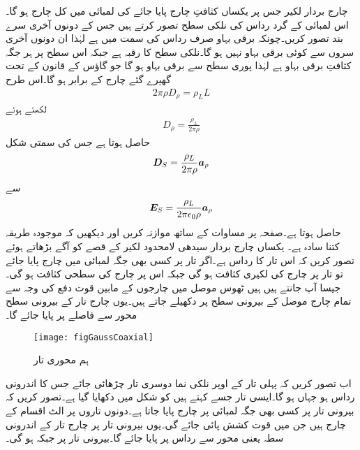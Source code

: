 چارج بردار لکیر جس پر یکساں کثافتِ چارج  پایا جائے  کی لمبائی  میں کل چارج  ہو گا۔اس لمبائی کے گرد  رداس کی نلکی سطح تصور کرتے ہیں جس کے دونوں آخری سرے بند تصور کریں۔چونکہ برقی بہاو صرف رداس کی سمت میں ہے لہٰذا ان دونوں آخری سروں سے کوئی برقی بہاو نہیں ہو گا۔نلکی سطح کا رقبہ  ہے جبکہ اس سطح پر ہر جگہ کثافتِ برقی بہاو   ہے لہٰذا پوری سطح سے  برقی بہاو ہو گا جو گاؤس کے قانون کے تحت گھیرے گئے چارج  کے برابر ہو گا۔اس طرح
\begin{align*}
2 \pi \rho D_{\rho} = \rho_L L
\end{align*}
لکھتے ہوئے
\begin{align*}
D_{\rho}=\frac{\rho_L}{2\pi \rho}
\end{align*}
حاصل ہوتا ہے جس کی سمتی شکل
\begin{align}\label{مساوات_گاؤس_لکیری_کثافت_کا_میدان}
{\ensuremath{{\boldsymbol{D}}}}_S=\frac{\rho_L}{2\pi \rho} {\boldsymbol{a}}_{\rho}
\end{align}
سے 
\begin{align*}
{\ensuremath{{\boldsymbol{E}}}}_S=\frac{\rho_L}{2\pi \epsilon_0\rho} {\boldsymbol{a}}_{\rho}
\end{align*}
حاصل ہوتا ہے۔صفحہ  پر مساوات  کے ساتھ موازنہ کریں اور دیکھیں کہ موجودہ طریقہ کتنا سادہ ہے۔
یکساں چارج بردار سیدھی لامحدود لکیر کے قصے کو آگے بڑھاتے ہوئے تصور کریں کہ اس تار کا رداس  ہے۔اگر تار پر کسی بھی  جگہ  لمبائی میں  چارج پایا جائے تو تار پر چارج کی لکیری کثافت   ہو گی جبکہ اس پر چارج کی سطحی کثافت  ہو گی۔جیسا آپ جانتے ہیں ہیں ٹھوس موصل میں چارجوں کے مابین قوت دفع کی وجہ سے تمام  چارج موصل کے بیرونی سطح پر دکھیلے جاتے ہیں۔یوں چارج  تار  کے  بیرونی سطح محور سے  فاصلے پر پایا جائے گا۔

\begin{figure}
\centering
\texttt{[image: figGaussCoaxial]}
\caption{ہم محوری تار}
\label{شکل_گاؤس_ہم_محوری_تار}
\end{figure}

اب تصور کریں کہ پہلی تار کے اوپر نلکی نما دوسری تار چڑھائی جائے جس کا اندرونی رداس  ہو جہاں  ہو گا۔ایسی تار جسے  کہتے ہیں کو شکل  میں دکھایا گیا ہے۔تصور کریں کہ بیرونی تار پر کسی بھی جگہ  لمبائی پر  چارج پایا جاتا ہے۔دونوں تاروں پر الٹ اقسام کے چارج ہیں جن میں قوت کشش پائی جائے گی۔یوں بیرونی تار پر چارج تار کے اندرونی سطہ یعنی محور سے  رداس پر پایا جائے گا۔بیرونی تار پر  جبکہ  ہو گی۔

